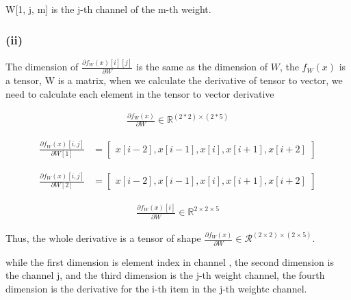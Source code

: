 \begin{enumerate}[(a)]
W[1, j, m] is the j-th channel of the m-th weight. 



\subsubsection*{(ii)}
The dimension of $\frac{\partial f_{W}(x)[i][j]}{\partial W}$ is the same as the dimension of $W$, the $f_W(x)$ is a tensor, W is a matrix, when we calculate the derivative of tensor to vector, we need to calculate each element in the tensor to vector derivative




\begin{align}
    \frac{\partial f_{W}(x)}{\partial W} \in \mathbb{R}^{(2*2) \times (2*5)}
\end{align}


\begin{align}
    \frac{\partial f_{W}(x)[i,j]}{\partial W[1]} 
    &=\begin{bmatrix}
        x[i-2], x[i-1], x[i], x[i+1], x[i+2]
    \end{bmatrix}
\end{align}

\begin{align}
    \frac{\partial f_{W}(x)[i,j]}{\partial W[2]} 
    &=\begin{bmatrix}
        x[i-2], x[i-1], x[i], x[i+1], x[i+2]
    \end{bmatrix}
\end{align}


\begin{align}
    \frac{\partial f_{W}(x)[i]}{\partial W} \in \mathbb{R}^{2 \times 2 \times 5}
\end{align}

Thus, the whole derivative is a tensor of shape $\frac {\partial f_W(x)}{\partial W} \in \mathcal{R} ^ {(2 \times 2) \times (2 \times 5)}$.

while the first dimension is element index in channel , the second dimension is the channel j, and the third dimension is the j-th weight channel, the fourth dimension is the derivative for the i-th item in the j-th weightc channel.






\end{enumerate}
